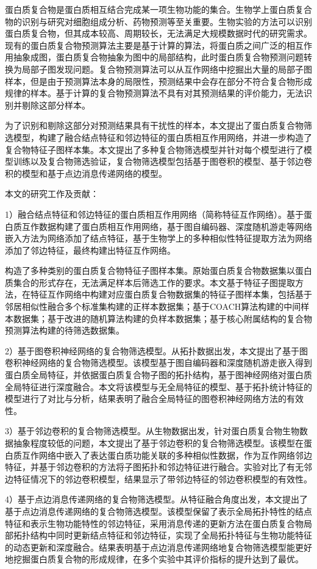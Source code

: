 \begin{cabstract}
  蛋白质复合物是蛋白质相互结合完成某一项生物功能的集合。生物学上蛋白质复合物的识别与研究对细胞组成分析、药物预测等至关重要。生物实验的方法可以识别蛋白质复合物，但其成本较高、周期较长，无法满足大规模数据时代的研究需求。
  现有的蛋白质复合物预测算法主要是基于计算的算法，将蛋白质之间广泛的相互作用抽象成图，蛋白质复合物抽象为图中的局部结构，此时蛋白质复合物预测问题转换为局部子图发现问题。复合物预测算法可以从互作网络中挖掘出大量的局部子图样本，但是由于预测算法本身的局限性，预测结果中会存在部分不符合复合物形成规律的样本。基于计算的复合物预测算法不具有对其预测结果的评价能力，无法识别并剔除这部分样本。

  为了识别和剔除这部分对预测结果具有干扰性的样本，本文提出了蛋白质复合物筛选模型，构建了融合结点特征和邻边特征的蛋白质相互作用网络，并进一步构造了复合物特征子图样本集。本文提出了多种复合物筛选模型并针对每个模型进行了模型训练以及复合物筛选验证，复合物筛选模型包括基于图卷积的模型、基于邻边卷积的模型和基于点边消息传递网络的模型。

  本文的研究工作及贡献：

  1）融合结点特征和邻边特征的蛋白质相互作用网络（简称特征互作网络）。基于蛋白质互作数据构建了蛋白质相互作用网络，基于图自编码器、深度随机游走等网络嵌入方法为网络添加了结点特征，基于生物学上的多种相似性特征提取方法为网络添加了邻边特征，最终构建出特征互作网络。

  构造了多种类别的蛋白质复合物特征子图样本集。原始蛋白质复合物数据集以蛋白质集合的形式存在，无法满足样本后筛选工作的要求。本文基于特征子图提取方法，在特征互作网络中构建对应蛋白质复合物数据集的特征子图样本集，包括基于邻居相似性融合多个标准集构建的正样本数据集；基于COACH算法构建的中间样本数据集；基于改进的随机算法构建的负样本数据集；基于核心附属结构的复合物预测算法构建的待筛选数据集。

  2）基于图卷积神经网络的复合物筛选模型。从拓扑数据出发，本文提出了基于图卷积神经网络的复合物筛选模型。该模型基于图自编码器和深度随机游走嵌入得到蛋白质全局特征，并依据蛋白质复合物子图的拓扑结构，基于图神经网络对蛋白质全局特征进行深度融合。本文将该模型与无全局特征的模型、基于拓扑统计特征的模型进行了对比与分析，结果表明了融合全局特征的图卷积神经网络方法的有效性。
  
  3）基于邻边卷积的复合物筛选模型。从生物数据出发，针对蛋白质复合物生物数据抽象程度较低的问题，本文提出了基于邻边卷积的复合物筛选模型。该模型在蛋白质互作网络中嵌入了表达蛋白质功能关联的多种相似性数据，作为互作网络邻边特征，并基于邻边卷积的方法将子图拓扑和邻边特征进行融合。实验对比了有无邻边特征情况下的邻边卷积模型，结果显示了带邻边特征的邻边卷积模型的有效性。

  4）基于点边消息传递网络的复合物筛选模型。从特征融合角度出发，本文提出了基于点边消息传递网络的复合物筛选模型。该模型保留了表示全局拓扑特性的结点特征和表示生物功能特性的邻边特征，采用消息传递的更新方法在蛋白质复合物局部拓扑结构中同时更新结点特征和邻边特征，实现了全局拓扑特征与生物功能特征的动态更新和深度融合。结果表明基于点边消息传递网络地复合物筛选模型能更好地挖掘蛋白质复合物的形成规律，在多个实验中其评价指标的提升达到了最优。

\end{cabstract}

